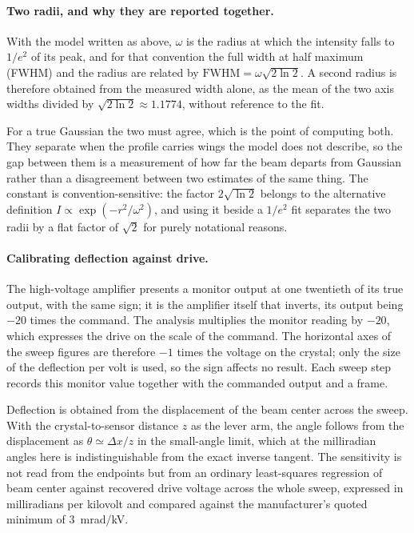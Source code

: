 \documentclass{article}
\begin{document}
\paragraph{Two radii, and why they are reported together.}
With the model written as above, $\omega$ is the radius at which the intensity falls to $1/e^2$
of its peak, and for that convention the full width at half maximum (FWHM) and the radius are
related by $\mathrm{FWHM} = \omega\sqrt{2\ln 2}$. A second radius is therefore obtained from the measured
width alone, as the mean of the two axis widths divided by $\sqrt{2\ln 2} \approx 1.1774$,
without reference to the fit.

For a true Gaussian the two must agree, which is the point of computing both. They separate when
the profile carries wings the model does not describe, so the gap between them is a measurement
of how far the beam departs from Gaussian rather than a disagreement between two estimates of the
same thing. The constant is convention-sensitive: the factor $2\sqrt{\ln 2}$ belongs to the
alternative definition $I \propto \exp(-r^2/\omega^2)$, and using it beside a $1/e^2$ fit
separates the two radii by a flat factor of $\sqrt{2}$ for purely notational reasons.

\paragraph{Calibrating deflection against drive.}
The high-voltage amplifier presents a monitor output at one twentieth of its true output, with the
same sign; it is the amplifier itself that inverts, its output being $-20$ times the command. The
analysis multiplies the monitor reading by $-20$, which expresses the drive on the scale of the
command. The horizontal axes of the sweep figures are therefore $-1$ times the voltage on the
crystal; only the size of the deflection per volt is used, so the sign affects no result. Each sweep step records this monitor value together with the commanded
output and a frame.

Deflection is obtained from the displacement of the beam center across the sweep. With the
crystal-to-sensor distance $z$ as the lever arm, the angle follows from the displacement as
$\theta \simeq \Delta x / z$ in the small-angle limit, which at the milliradian angles here is
indistinguishable from the exact inverse tangent. The sensitivity is not read from the endpoints
but from an ordinary least-squares regression of beam center against recovered drive voltage
across the whole sweep, expressed in milliradians per kilovolt and compared against the
manufacturer's quoted minimum of 3~mrad/kV.
\end{document}
